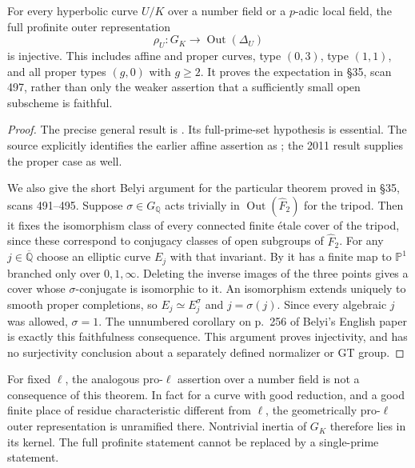 For every hyperbolic curve $U/K$ over a number field or a $p$-adic local
field, the full profinite outer representation
\[
 \rho_U:G_K\longrightarrow\operatorname{Out}(\Delta_U)
\]
is injective.  This includes affine and proper curves, type $(0,3)$,
type $(1,1)$, and all proper types $(g,0)$ with $g\geq2$.
It proves the expectation in \S35, scan 497, rather than only the weaker
assertion that a sufficiently small open subscheme is faithful.
\begin{proof}
The precise general result is
\citet[Corollary 6.3(i), with one configuration point]{HoshiMochizuki2011}.
Its full-prime-set hypothesis is essential.  The source explicitly identifies
the earlier affine assertion as
\citet[Theorem 2.1]{Matsumoto1996}; the 2011 result supplies the proper case
as well.

We also give the short Belyi argument for the particular theorem proved in
\S35, scans 491--495.  Suppose $\sigma\in G_{\mathbb Q}$ acts trivially in
$\operatorname{Out}(\widehat F_2)$ for the tripod.  Then it fixes the
isomorphism class of every connected finite \'etale cover of the tripod,
since these correspond to conjugacy classes of open subgroups of
$\widehat F_2$.  For any $j\in\overline{\mathbb Q}$ choose an elliptic curve
$E_j$ with that invariant.  By \citet[Section 4, Theorem 4]{Belyi1980} it
has a finite map to $\mathbb P^1$ branched only over $0,1,\infty$.
Deleting the inverse images of the three points gives a cover whose
$\sigma$-conjugate is isomorphic to it.  An isomorphism extends uniquely to
smooth proper completions, so $E_j\simeq E_j^\sigma$ and
$j=\sigma(j)$.  Since every algebraic $j$ was allowed, $\sigma=1$.
The unnumbered corollary on p.~256 of Belyi's English paper is exactly this
faithfulness consequence.  This argument proves injectivity, and has no
surjectivity conclusion about a separately defined normalizer or GT group.
\end{proof}
For fixed $\ell$, the analogous pro-$\ell$ assertion over a number field
is not a consequence of this theorem.  In fact for a curve with good
reduction, and a good finite place of residue characteristic different from
$\ell$, the geometrically pro-$\ell$ outer representation is unramified
there.  Nontrivial inertia of $G_K$ therefore lies in its kernel.
The full profinite statement cannot be replaced by a single-prime statement.

